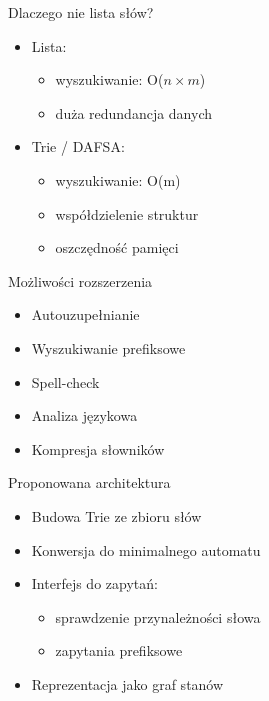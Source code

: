 \documentclass{beamer}
\begin{document}

\begin{frame}{Dlaczego nie lista słów?}
    \begin{itemize}
        \item Lista:
              \begin{itemize}
                  \item wyszukiwanie: O($n \times m$)
                  \item duża redundancja danych
              \end{itemize}

        \item Trie / DAFSA:
              \begin{itemize}
                  \item wyszukiwanie: O(m)
                  \item współdzielenie struktur
                  \item oszczędność pamięci
              \end{itemize}
    \end{itemize}
\end{frame}


\begin{frame}{Możliwości rozszerzenia}
    \begin{itemize}
        \item Autouzupełnianie
        \item Wyszukiwanie prefiksowe
        \item Spell-check
        \item Analiza językowa
        \item Kompresja słowników
    \end{itemize}
\end{frame}


\begin{frame}{Proponowana architektura}
    \begin{itemize}
        \item Budowa Trie ze zbioru słów
        \item Konwersja do minimalnego automatu
        \item Interfejs do zapytań:
              \begin{itemize}
                  \item sprawdzenie przynależności słowa
                  \item zapytania prefiksowe
              \end{itemize}
        \item Reprezentacja jako graf stanów
    \end{itemize}
\end{frame}
\end{document}
